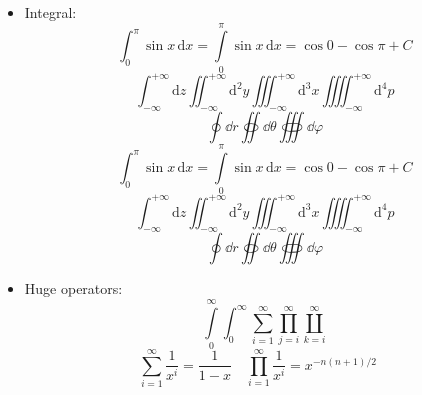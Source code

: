 \documentclass { article }
\begin{document}
\begin{itemize}
  \item Integral:
        \[
            \int_0^\pi        \sin x \, \mathrm{d} x
          = \int\limits_0^\pi \sin x \, \mathrm{d} x
          = \cos 0 - \cos\pi + C
        \]
        \[
          \int_{-\infty}^{+\infty}    \mathrm{d} z
          \iint_{-\infty}^{+\infty}   \mathrm{d}^2 y
          \iiint_{-\infty}^{+\infty}  \mathrm{d}^3 x
          \iiiint_{-\infty}^{+\infty} \mathrm{d}^4 p
        \]
        \[ \oint \dd{r} \oiint \dd{\theta} \oiiint \dd{\varphi}\]
        \begingroup
          \[
              \int_0^\pi        \sin x \, \mathrm{d} x
            = \int\limits_0^\pi \sin x \, \mathrm{d} x
            = \cos 0 - \cos\pi + C
          \]
          \[
            \int_{-\infty}^{+\infty}    \mathrm{d} z
            \iint_{-\infty}^{+\infty}   \mathrm{d}^2 y
            \iiint_{-\infty}^{+\infty}  \mathrm{d}^3 x
            \iiiint_{-\infty}^{+\infty} \mathrm{d}^4 p
          \]
          \[ \oint \dd{r} \oiint \dd{\theta} \oiiint \dd{\varphi} \]
        \endgroup
  \item Huge operators:
        \[
          \int\limits_0^\infty \int_0^\infty
          \sum_{i=1}^\infty \prod_{j=i}^\infty \coprod_{k=i}^\infty
        \]
        \[
          \sum_{i=1}^\infty    \frac{1}{x^i} = \frac{1}{1-x} \quad
          \prod_{i=1}^\infty   \frac{1}{x^i} = x^{-n(n+1)/2} \quad
\]
\end{itemize}
\end{document}
